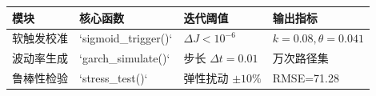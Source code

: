 \documentclass{mcmthesis}
\begin{document}
\begin{table}[htbp]
\centering
\begin{tabular}{l l l l}
\toprule
模块 & 核心函数 & 迭代阈值 & 输出指标 \\
\midrule
软触发校准 & `sigmoid\_trigger()` & $\Delta J < 10^{-6}$ & $k=0.08, \theta=0.041$ \\
波动率生成 & `garch\_simulate()` & 步长 $\Delta t=0.01$ & 万次路径集 \\
鲁棒性检验 & `stress\_test()` & 弹性扰动 $\pm 10\%$ & RMSE=71.28 \\
\bottomrule
\end{tabular}
\end{table}
\end{document}
